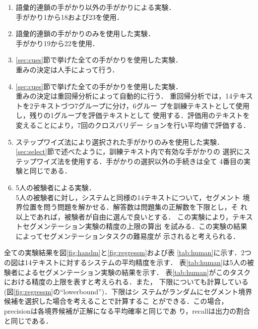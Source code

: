 \begin{enumerate}
\item 語彙的連鎖の手がかり以外の手がかりによる実験．\\
	手がかり1から18および23を使用．

\item 語彙的連鎖の手がかりのみを使用した実験．\\
	手がかり19から22を使用．

\item \ref{sec:cues}節で挙げた全ての手がかりを使用した実験．\\
	重みの決定は人手によって行う．

\item \ref{sec:cues}節で挙げた全ての手がかりを使用した実験．\\
	重みの決定は重回帰分析によって自動的に行う．
	重回帰分析では，14テキストを2テキストづつ7グループに分け，6グルー
	プを訓練テキストとして使用し，残りの1グループを評価テキストとして
	使用する．評価用のテキストを変えることにより，7回のクロスバリデー
	ション\cite{Weiss:91}を行い平均値で評価する．

\item ステップワイズ法により選択された手がかりのみを使用した実験．\\
	\ref{sec:select}節で述べたように，訓練テキスト内で有効な手がかりの
	選択にステップワイズ法を使用する．手がかりの選択以外の手続きは全て
	4番目の実験と同じである．

\item 5人の被験者による実験．\\
	5人の被験者に対し，システムと同様の14テキストについて，セグメント
	境界位置を問う問題を解かせる．解答数は問題集の正解数を下限とし，そ
	れ以上であれば，被験者が自由に選んで良いとする．
	この実験により，テキストセグメンテーション実験の精度の上限の算出
	を試みる．この実験の結果によってセグメンテーションタスクの難易度が
	示されると考えられる\cite{Passonneau:93,Gale:92}．
\end{enumerate}

全ての実験結果を図\ref{fig:handm}と\ref{fig:regressm}および表
\ref{tab:human}に示す．2つの図は14テキストに対するシステムの平均精度を示す．
表\ref{tab:human}は5人の被験者によるセグメンテーション実験の結果を示す．
表\ref{tab:human}がこのタスクにおける精度の上限を表すと考えられる．また，
下限についても計算している(図\ref{fig:regressm}の``lowerbound'')．下限はシ
ステムがランダムにセグメント境界候補を選択した場合を考えることで計算するこ
とができる．この場合，precisionは各境界候補が正解になる平均確率と同じであ
り，recallは出力の割合と同じである．

